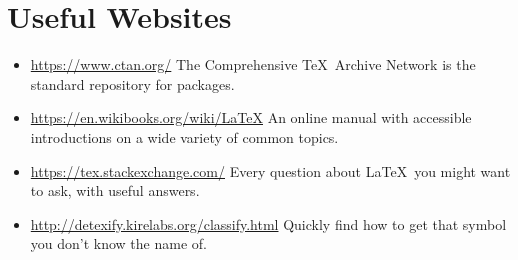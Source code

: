 \chapter{Useful Websites}

\begin{itemize}
    \item
    \url{https://www.ctan.org/}
    The Comprehensive \TeX\ Archive Network is the standard repository for packages.
    \item
    \url{https://en.wikibooks.org/wiki/LaTeX}
    An online manual with accessible introductions on a wide variety of common topics.
    \item
    \url{https://tex.stackexchange.com/}
    Every question about \LaTeX\ you might want to ask, with useful answers.
    \item
    \url{http://detexify.kirelabs.org/classify.html}
    Quickly find how to get that symbol you don't know the name of.
\end{itemize}
